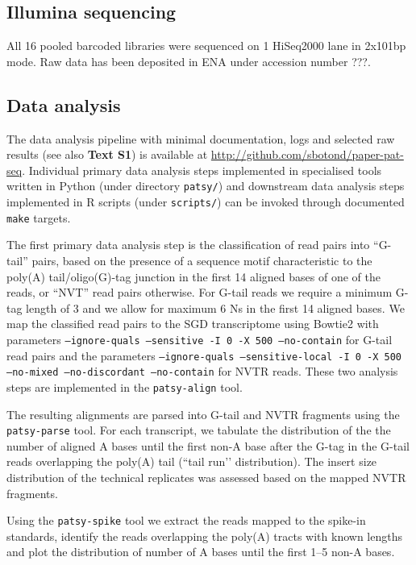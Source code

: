 \documentclass[10pt]{article}
\begin{document}
\subsection*{Illumina sequencing}

All 16 pooled barcoded libraries were sequenced on 1 HiSeq2000 lane in 2x101bp mode. Raw data has been deposited in ENA under accession number ???.

\subsection*{Data analysis}

The data analysis pipeline with minimal documentation, logs and selected raw results (see also \textbf{Text S1}) is available at \href{http://github.com/sbotond/paper-pat-seq}{http://github.com/sbotond/paper-pat-seq}. Individual primary data analysis steps implemented in specialised tools written in Python (under directory \texttt{patsy/})  and downstream data analysis steps implemented in R scripts (under \texttt{scripts/}) can be invoked through documented \texttt{make} targets.

The first primary data analysis step is the classification of read pairs into “G-tail” pairs, based on the presence of a sequence motif characteristic to the poly(A) tail/oligo(G)-tag junction in the first 14 aligned bases of one of the reads, or “NVT” read pairs otherwise. For G-tail reads we require a minimum G-tag length of 3 and we allow for maximum 6 Ns in the first 14 aligned bases. We map the classified read pairs to the SGD transcriptome \cite{engel13} using Bowtie2 \cite{langmead12} with parameters \texttt{--ignore-quals --sensitive -I 0 -X 500 --no-contain} for G-tail read pairs and the parameters \texttt{--ignore-quals --sensitive-local -I 0 -X 500 --no-mixed --no-discordant --no-contain} for NVTR reads. These two analysis steps are implemented in the \texttt{patsy-align} tool. 

The resulting alignments are parsed into G-tail and NVTR fragments using the \texttt{patsy-parse} tool. For each transcript, we tabulate the distribution of the the number of aligned A bases until the first non-A base after the G-tag in the G-tail reads overlapping the poly(A) tail (``tail run’’ distribution). The insert size distribution of the technical replicates was assessed based on the mapped NVTR fragments.

Using the \texttt{patsy-spike} tool we extract the reads mapped to the spike-in standards, identify the reads overlapping the poly(A) tracts with known lengths and plot the distribution of number of A bases until the first 1--5 non-A bases.
\end{document}

